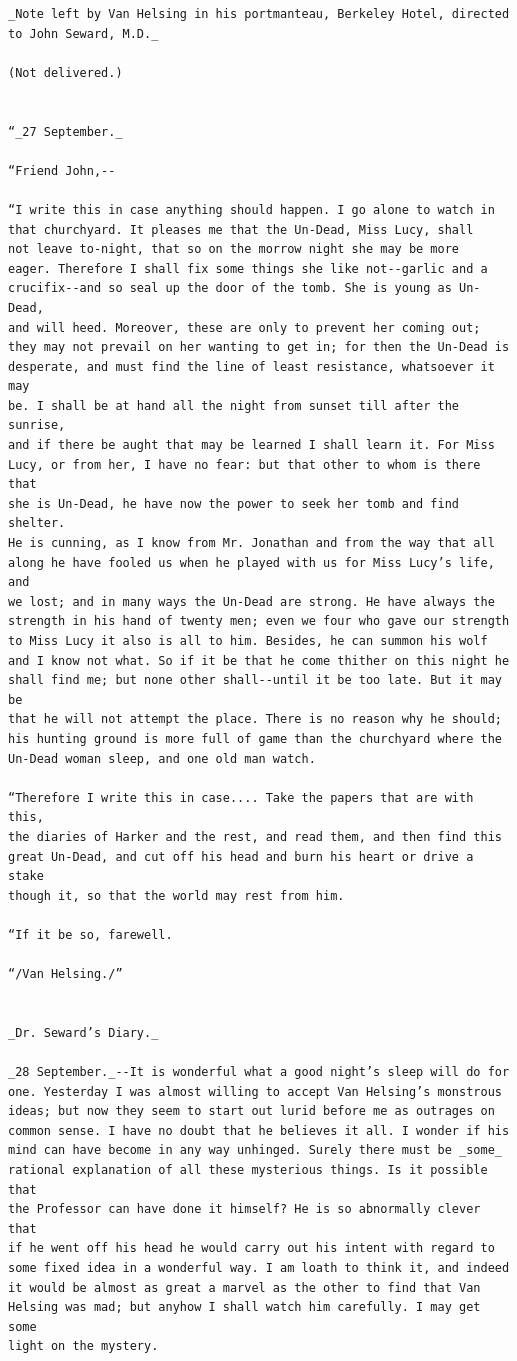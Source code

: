 \documentclass{article}
\begin{document}
\begin{verbatim}
_Note left by Van Helsing in his portmanteau, Berkeley Hotel, directed
to John Seward, M.D._

(Not delivered.)


“_27 September._

“Friend John,--

“I write this in case anything should happen. I go alone to watch in
that churchyard. It pleases me that the Un-Dead, Miss Lucy, shall
not leave to-night, that so on the morrow night she may be more
eager. Therefore I shall fix some things she like not--garlic and a
crucifix--and so seal up the door of the tomb. She is young as Un-Dead,
and will heed. Moreover, these are only to prevent her coming out;
they may not prevail on her wanting to get in; for then the Un-Dead is
desperate, and must find the line of least resistance, whatsoever it may
be. I shall be at hand all the night from sunset till after the sunrise,
and if there be aught that may be learned I shall learn it. For Miss
Lucy, or from her, I have no fear: but that other to whom is there that
she is Un-Dead, he have now the power to seek her tomb and find shelter.
He is cunning, as I know from Mr. Jonathan and from the way that all
along he have fooled us when he played with us for Miss Lucy’s life, and
we lost; and in many ways the Un-Dead are strong. He have always the
strength in his hand of twenty men; even we four who gave our strength
to Miss Lucy it also is all to him. Besides, he can summon his wolf
and I know not what. So if it be that he come thither on this night he
shall find me; but none other shall--until it be too late. But it may be
that he will not attempt the place. There is no reason why he should;
his hunting ground is more full of game than the churchyard where the
Un-Dead woman sleep, and one old man watch.

“Therefore I write this in case.... Take the papers that are with this,
the diaries of Harker and the rest, and read them, and then find this
great Un-Dead, and cut off his head and burn his heart or drive a stake
though it, so that the world may rest from him.

“If it be so, farewell.

“/Van Helsing./”


_Dr. Seward’s Diary._

_28 September._--It is wonderful what a good night’s sleep will do for
one. Yesterday I was almost willing to accept Van Helsing’s monstrous
ideas; but now they seem to start out lurid before me as outrages on
common sense. I have no doubt that he believes it all. I wonder if his
mind can have become in any way unhinged. Surely there must be _some_
rational explanation of all these mysterious things. Is it possible that
the Professor can have done it himself? He is so abnormally clever that
if he went off his head he would carry out his intent with regard to
some fixed idea in a wonderful way. I am loath to think it, and indeed
it would be almost as great a marvel as the other to find that Van
Helsing was mad; but anyhow I shall watch him carefully. I may get some
light on the mystery.


\end{verbatim}
\end{document}
